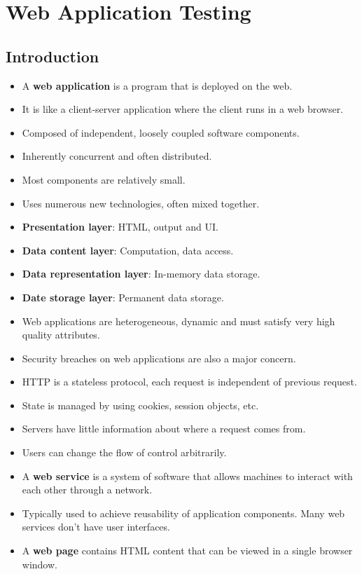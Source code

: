 \documentclass[a4paper]{article}
\begin{document}
\section{Web Application Testing}
\subsection{Introduction}
\begin{itemize}
    \item A \textbf{web application} is a program that is deployed on the web.
    \item It is like a client-server application where the client runs in a web browser.
    \item Composed of independent, loosely coupled software components.
    \item Inherently concurrent and often distributed.
    \item Most components are relatively small.
    \item Uses numerous new technologies, often mixed together.
    \item \textbf{Presentation layer}: HTML, output and UI.
    \item \textbf{Data content layer}: Computation, data access.
    \item \textbf{Data representation layer}: In-memory data storage.
    \item \textbf{Date storage layer}: Permanent data storage.
    \item Web applications are heterogeneous, dynamic and must satisfy very high quality attributes.
    \item Security breaches on web applications are also a major concern.
    \item HTTP is a stateless protocol, each request is independent of previous request.
    \item State is managed by using cookies, session objects, etc.
    \item Servers have little information about where a request comes from.
    \item Users can change the flow of control arbitrarily.
    \item A \textbf{web service} is a system of software that allows machines to interact with each other through a network.
    \item Typically used to achieve reusability of application components. Many web services don't have user interfaces.
    \item A \textbf{web page} contains HTML content that can be viewed in a single browser window.

\end{itemize}
\end{document}
